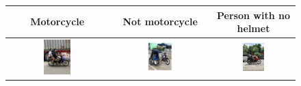 \begin{refsection}
\begin{figure}[H]
\centering
\begin{tabular}{|c|c|c|}
\hline
Motorcycle & Not motorcycle & Person with no helmet \\
\hline
\includegraphics[width=0.28\textwidth]{figures/Fig 7.png} & 
\includegraphics[width=0.28\textwidth]{figures/Fig 8.png} & 
\includegraphics[width=0.28\textwidth]{figures/Fig 9.png} \\
\hline
\end{tabular}

\vspace{0.3cm} %


\end{figure}
\end{refsection}
